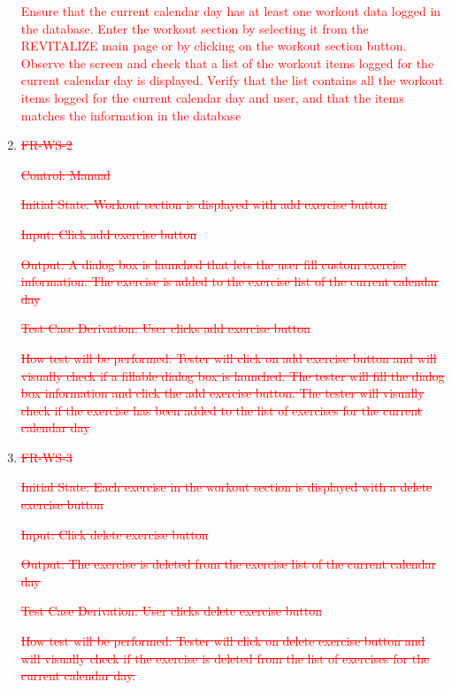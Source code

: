 \documentclass[12pt, titlepage]{article}
\begin{document}
\begin{enumerate}
	\textcolor{red}{Ensure that the current calendar day has at least one workout data logged in the database. Enter the workout section by selecting it from the REVITALIZE main page or by clicking on the workout section button. Observe the screen and check that a list of the workout items logged for the current calendar day is displayed. Verify that the list contains all the workout items logged for the current calendar day and user, and that the items matches the information in the database}
	
\item{\textcolor{red}{\sout{FR-WS-2}}}
	
\textcolor{red}{\sout{Control: Manual}}

\textcolor{red}{\sout{Initial State: Workout section is displayed with add exercise button}}

\textcolor{red}{\sout{Input: Click add exercise button}}

\textcolor{red}{\sout{Output: A dialog box is launched that lets the user fill custom exercise information. The exercise is added to the exercise list of the current calendar day}}

\textcolor{red}{\sout{Test Case Derivation: User clicks add exercise button}}

\textcolor{red}{\sout{How test will be performed: Tester will click on add exercise button and will visually check if a fillable dialog box is launched. The tester will fill the dialog box information and click the add exercise button. The tester will visually check if the exercise has been added to the list of exercises for the current calendar day}}

\item{\textcolor{red}{\sout{FR-WS-3}}\\}

\textcolor{red}{\sout{Initial State: Each exercise in the workout section is displayed with a delete exercise button}}

\textcolor{red}{\sout{Input: Click delete exercise button}}

\textcolor{red}{\sout{Output: The exercise is deleted from the exercise list of the current calendar day}}

\textcolor{red}{\sout{Test Case Derivation: User clicks delete exercise button}}

\textcolor{red}{\sout{How test will be performed: Tester will click on delete exercise button and will visually check if the exercise is deleted from the list of exercises for the current calendar day. }}


\end{enumerate}
\end{document}
